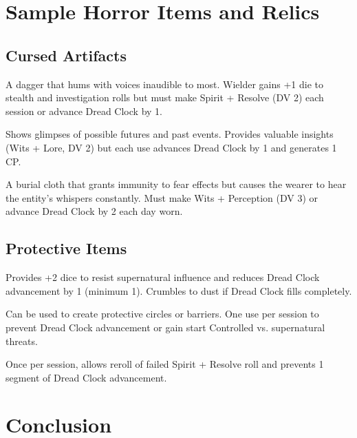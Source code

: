 \documentclass[11pt]{article}
\begin{document}
\section*{Sample Horror Items and Relics}

\subsection*{Cursed Artifacts}

\begin{description}[leftmargin=*]
\item[Whispering Blade] A dagger that hums with voices inaudible to most. Wielder gains +1 die to stealth and investigation rolls but must make Spirit + Resolve (DV 2) each session or advance Dread Clock by 1.
\item[Mirror of the Forgotten] Shows glimpses of possible futures and past events. Provides valuable insights (Wits + Lore, DV 2) but each use advances Dread Clock by 1 and generates 1 CP.
\item[Shroud of Whispers] A burial cloth that grants immunity to fear effects but causes the wearer to hear the entity's whispers constantly. Must make Wits + Perception (DV 3) or advance Dread Clock by 2 each day worn.
\end{description}

\subsection*{Protective Items}

\begin{description}[leftmargin=*]
\item[Blessed Warding Stone] Provides +2 dice to resist supernatural influence and reduces Dread Clock advancement by 1 (minimum 1). Crumbles to dust if Dread Clock fills completely.
\item[Sanctified Salt] Can be used to create protective circles or barriers. One use per session to prevent Dread Clock advancement or gain start Controlled vs. supernatural threats.
\item[Prayer Book of the Steadfast] Once per session, allows reroll of failed Spirit + Resolve roll and prevents 1 segment of Dread Clock advancement.
\end{description}

\section*{Conclusion}
\end{document}
